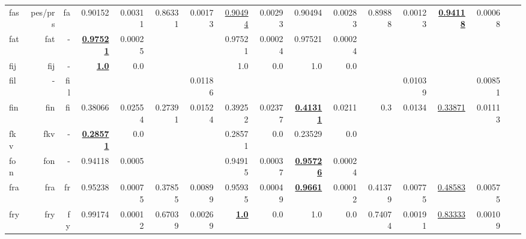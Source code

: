\documentclass[11pt]{article}
\begin{document}
\begin{table*}[h]
{\begin{tabular}{lrrrrrrrrrrrrrrrr}
fas         & pes/prs         & fa         & 0.90152         & 0.00311         & 0.86331         & 0.00173         & \underline{0.90494}         & 0.00293         & 0.90494         & 0.00283         & 0.89888         & 0.00123         & \textbf{\underline{0.94118}}         & 0.00068         \\
fat         & fat         & -         & \textbf{\underline{0.97521}}         & 0.00025         &          &          & 0.97521         & 0.00024         & 0.97521         & 0.00024         &          &          &          &          \\
fij         & fij         & -         & \textbf{\underline{1.0}}         & 0.0         &          &          & 1.0         & 0.0         & 1.0         & 0.0         &          &          &          &          \\
fil         & -         & fil         &          &          &          & 0.01186         &          &          &          &          &          & 0.01039         &          & 0.00851         \\
fin         & fin         & fi         & 0.38066         & 0.02554         & 0.27391         & 0.01524         & 0.39252         & 0.02377         & \textbf{\underline{0.41311}}         & 0.0211         & 0.3         & 0.0134         & \underline{0.33871}         & 0.01113         \\
fkv         & fkv         & -         & \textbf{\underline{0.28571}}         & 0.0         &          &          & 0.28571         & 0.0         & 0.23529         & 0.0         &          &          &          &          \\
fon         & fon         & -         & 0.94118         & 0.0005         &          &          & 0.94915         & 0.00037         & \textbf{\underline{0.95726}}         & 0.00024         &          &          &          &          \\
fra         & fra         & fr         & 0.95238         & 0.00075         & 0.37855         & 0.00899         & 0.95935         & 0.00049         & \textbf{\underline{0.9661}}         & 0.00012         & 0.41379         & 0.00775         & \underline{0.48583}         & 0.00575         \\
fry         & fry         & fy         & 0.99174         & 0.00012         & 0.67039         & 0.00269         & \textbf{\underline{1.0}}         & 0.0         & 1.0         & 0.0         & 0.74074         & 0.00191         & \underline{0.83333}         & 0.00109         \\

\end{tabular}}
\end{table*}
\end{document}
